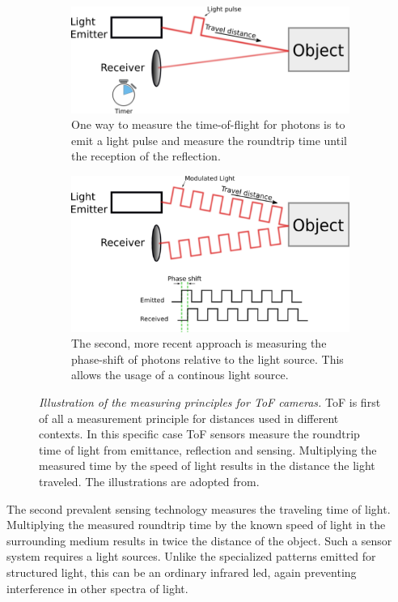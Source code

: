 \begin{figure}[H]
    \centering
    \begin{subfigure}[t]{0.45\textwidth}
        \includegraphics[width=\textwidth]{chapter03/img/tof_traveltime_original.png}
        \caption{One way to measure the time-of-flight for photons is to emit a light pulse and measure the roundtrip time until the reception of the reflection.}\label{fig:tof_roundtrip}
    \end{subfigure}\quad
    \begin{subfigure}[t]{0.45\textwidth}
        \includegraphics[width=\textwidth]{chapter03/img/tof_phase_shift_original.png}
        \caption{The second, more recent approach is measuring the phase-shift of photons relative to the light source. This allows the usage of a continous light source.}\label{fig:tof_phase_shift}
    \end{subfigure}
    \caption[Illustration of the measuring principles for \acrshort{ToF} cameras]{\emph{Illustration of the measuring principles for \acrshort{ToF} cameras.} \acrlong{ToF} is first of all a measurement principle for distances used in different contexts. In this specific case \acrshort{ToF} sensors measure the roundtrip time of light from emittance, reflection and sensing. Multiplying the measured time by the speed of light results in the distance the light traveled. The illustrations are adopted from\cite{tof_cameras}.}\label{fig:tof_illustration}
\end{figure}
The second prevalent sensing technology measures the traveling time of light\cite{hansard_springer2012}.
Multiplying the measured roundtrip time by the known speed of light in the surrounding medium results in twice the distance of the object.
Such a sensor system requires a light sources.
Unlike the specialized patterns emitted for structured light, this can be an ordinary infrared \acrshort{led}, again preventing interference in other spectra of light.

